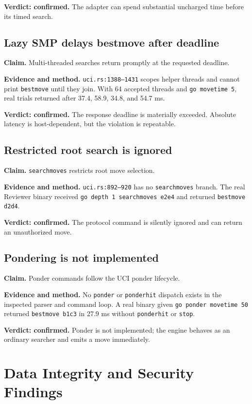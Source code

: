 \documentclass[conference]{IEEEtran}
\newcommand{\code}[1]{\texttt{\small #1}}
\begin{document}
\textbf{Verdict: confirmed.} The adapter can spend substantial uncharged time before its timed search.

\subsection{Lazy SMP delays bestmove after deadline}
\textbf{Claim.} Multi-threaded searches return promptly at the requested deadline.

\textbf{Evidence and method.} \code{uci.rs:1388--1431} scopes helper threads and cannot print \code{bestmove} until they join. With 64 accepted threads and \code{go movetime 5}, real trials returned after 37.4, 58.9, 34.8, and 54.7 ms.

\textbf{Verdict: confirmed.} The response deadline is materially exceeded. Absolute latency is host-dependent, but the violation is repeatable.

\subsection{Restricted root search is ignored}
\textbf{Claim.} \code{searchmoves} restricts root move selection.

\textbf{Evidence and method.} \code{uci.rs:892--920} has no \code{searchmoves} branch. The real Reviewer binary received \code{go depth 1 searchmoves e2e4} and returned \code{bestmove d2d4}.

\textbf{Verdict: confirmed.} The protocol command is silently ignored and can return an unauthorized move.

\subsection{Pondering is not implemented}
\textbf{Claim.} Ponder commands follow the UCI ponder lifecycle.

\textbf{Evidence and method.} No \code{ponder} or \code{ponderhit} dispatch exists in the inspected parser and command loop. A real binary given \code{go ponder movetime 50} returned \code{bestmove b1c3} in 27.9 ms without \code{ponderhit} or \code{stop}.

\textbf{Verdict: confirmed.} Ponder is not implemented; the engine behaves as an ordinary searcher and emits a move immediately.

\section{Data Integrity and Security Findings}
\end{document}
